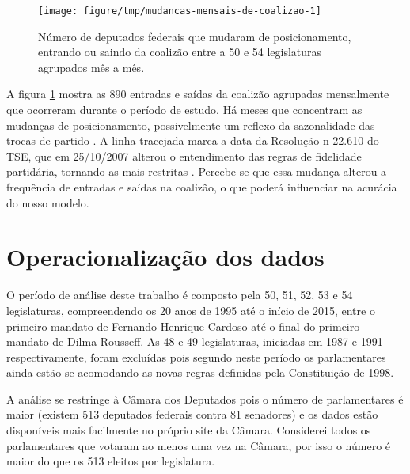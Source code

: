 \documentclass[a4paper,titlepage]{ppgi}\usepackage[]{graphicx}\usepackage[]{color}
\newenvironment{knitrout}{}{} %
\begin{document}
\begin{knitrout}
\color{fgcolor}\begin{figure}
\texttt{[image: figure/tmp/mudancas-mensais-de-coalizao-1]} \caption[Número de deputados federais que mudaram de posicionamento, entrando ou saindo da coalizão entre a 50\textordfeminine{} e 54\textordfeminine{} legislaturas agrupados mês a mês]{Número de deputados federais que mudaram de posicionamento, entrando ou saindo da coalizão entre a 50\textordfeminine{} e 54\textordfeminine{} legislaturas agrupados mês a mês.}\label{fig:mudancas-mensais-de-coalizao}
\end{figure}


\end{knitrout}

A figura \ref{fig:mudancas-mensais-de-coalizao} mostra as
890 entradas e saídas da coalizão agrupadas
mensalmente que ocorreram durante o período de estudo. Há meses que concentram
as mudanças de posicionamento, possivelmente um reflexo da sazonalidade das
trocas de partido \cite{Araujo2000,Melo2004,Freitas2008}. A linha tracejada
marca a data da Resolução n\textordmasculine{} 22.610 do TSE, que em
25/10/2007 alterou o entendimento das
regras de fidelidade partidária, tornando-as mais restritas \cite{TSE2007}.
Percebe-se que essa mudança alterou a frequência de entradas e saídas na
coalizão, o que poderá influenciar na acurácia do nosso modelo.

\section{Operacionalização dos dados}


O período de análise deste trabalho é composto pela 50\textordfeminine{},
51\textordfeminine{}, 52\textordfeminine{}, 53\textordfeminine{} e
54\textordfeminine{} legislaturas, compreendendo os 20 anos de 1995 até o
início de 2015, entre o primeiro mandato de Fernando Henrique Cardoso até o
final do primeiro mandato de Dilma Rousseff. As 48\textordfeminine{} e
49\textordfeminine{} legislaturas, iniciadas em 1987 e 1991 respectivamente,
foram excluídas pois segundo  neste período os
parlamentares ainda estão se acomodando as novas regras definidas pela
Constituição de 1998.


A análise se restringe à Câmara dos Deputados pois o número de parlamentares é
maior (existem 513 deputados federais contra 81 senadores) e os dados estão
disponíveis mais facilmente no próprio site da Câmara. Considerei todos os
parlamentares que votaram ao menos uma vez na Câmara, por isso o número é maior
do que os 513 eleitos por legislatura.
\end{document}
